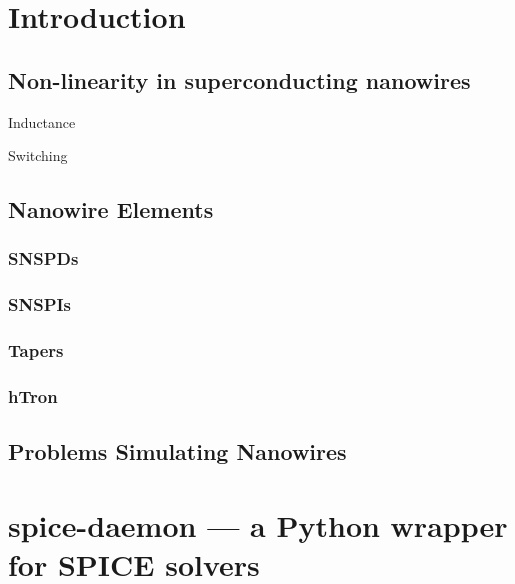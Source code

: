 \documentclass{article}
\begin{document}


\tableofcontents

\newpage


\section{Introduction}

\subsection{Non-linearity in superconducting nanowires}

Inductance

Switching

\subsection{Nanowire Elements}

\subsubsection{SNSPDs}

\subsubsection{SNSPIs}

\subsubsection{Tapers}

\subsubsection{hTron}

\subsection{Problems Simulating Nanowires}

\section{spice-daemon --- a Python wrapper for SPICE solvers}
\end{document}
